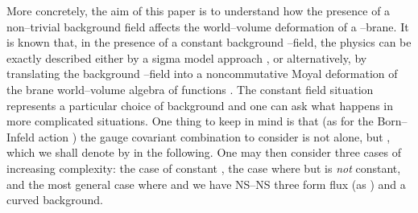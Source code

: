 \documentclass[a4paper,11pt]{article}
\begin{document}
More concretely, the aim of this paper is to understand how the presence of
a non--trivial background field affects the world--volume deformation of a
\coordHE{}--brane. It is known that, in the presence of a constant background
\coordHE{}--field, the physics can be exactly described either by a sigma model
approach \cite{AFM, Fradkin-Tseytlin, BCZ, Dorn-Otto, ACNY, CLNY, Tseytlin,
Laidlaw}, or alternatively, by translating the background \coordHE{}--field into a
noncommutative Moyal deformation of the brane world--volume algebra of
functions \cite{Schomerus, Seiberg-Witten}. The constant field situation
represents a particular choice of background and one can ask what happens
in more complicated situations. One thing to keep in mind is that (as for
the Born--Infeld action \cite{Leigh, Polchinski, Witten-2}) the gauge
covariant combination to consider is not \coordHE{} alone, but \coordHE{}, which we
shall denote by \coordHE{} in the following. One may then consider
three cases of increasing complexity: the case of constant \myHighlight{$\omega$}\coordHE{}, the
case where \coordHE{} but \myHighlight{$\omega$}\coordHE{} is \textit{not} constant, and the most
general case where \coordHE{} and we have NS--NS three form flux
(as \coordHE{}) and a curved background.
\end{document}
